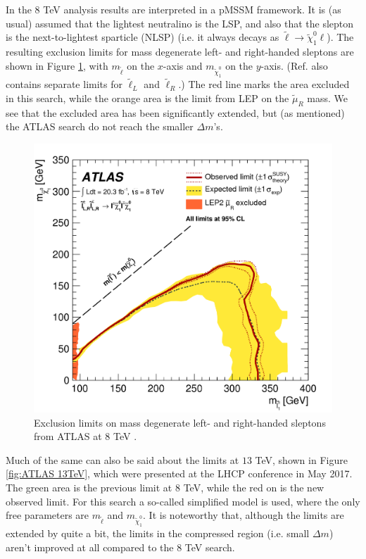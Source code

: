 \documentclass[twocolumn,a4paper,10pt]{article}
\begin{document}
In the $8$ TeV analysis results are interpreted in a pMSSM framework. It is (as usual) assumed that 
the lightest neutralino is the LSP, and also that the slepton is the next-to-lightest sparticle (NLSP) 
(i.e. it always decays as $\tilde{\ell}\rightarrow \tilde{\chi}_1^0 \ell$). The resulting exclusion 
limits for mass degenerate left- and right-handed sleptons are shown in Figure \ref{fig:ATLAS 8TeV}, 
with $m_{\tilde{\ell}}$ on the $x$-axis and $m_{\tilde{\chi}_1^0}$ on the $y$-axis.  
(Ref. \cite{ATLAS:2014} also contains separate limits for $\tilde{\ell}_L$ and $\tilde{\ell}_R$.)   
The red line marks the area excluded in this search, while the orange area is the limit from 
LEP on the $\tilde{\mu}_R$ mass. We see that the excluded area has been significantly extended, but 
(as mentioned) the ATLAS search do not reach the smaller $\Delta m$'s.

\begin{figure}
\begin{center}
\includegraphics[scale=0.1]{Run1exclusion.png}
\caption{Exclusion limits on mass degenerate left- and right-handed sleptons from ATLAS at 
$8$ TeV \cite{ATLAS:2014}.}
\label{fig:ATLAS 8TeV}
\end{center}
\end{figure}  

Much of the same can also be said about the limits at $13$ TeV, shown in Figure \ref{fig:ATLAS 13TeV}, 
which were presented at the LHCP conference in May 2017. The green area is the previous limit at $8$ 
TeV, while the red on is the new observed limit. For this search a so-called simplified model is used, 
where the only free parameters are $m_{\tilde{\ell}}$ and $m_{\tilde{\chi}_1^0}$. It is noteworthy 
that, although the limits are extended by quite a bit, the limits in the compressed region (i.e.  
small $\Delta m$) aren't improved at all compared to the $8$ TeV search.        
\end{document}
